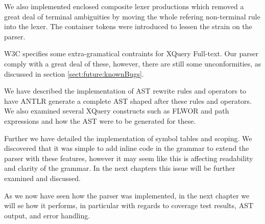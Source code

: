 We also implemented enclosed composite lexer productions which removed a great
deal of terminal ambiguities by moving the whole refering non-terminal rule
into the lexer. The container tokens were introduced to lessen the strain on
the parser.   

W3C specifies some extra-gramatical contraints for XQuery Full-text. Our parser
comply with a great deal of these, however, there are still some
unconformities, as discussed in section \ref{sect:future:knownBugs}.  

We have described the implementation of AST rewrite rules and operators to have
ANTLR generate a complete AST shaped after these rules and operators. We also
examined several XQuery constructs such as FLWOR and path expressions and how
the AST were to be generated for these.

Further we have detailed the implementation of symbol tables and scoping. We
discovered that it was simple to add inline code in the grammar to extend the
parser with these features, however it may seem like this is affecting
readability and clarity of the grammar. In the next chapters this issue will be
further examined and discussed.

As we now have seen how the parser was implemented, in the next chapter we will
se how it performs, in particular with regards to coverage test results, AST
output, and error handling.
